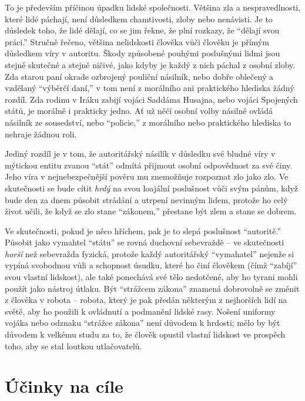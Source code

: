 \documentclass{book}
\begin{document}
To je především příčinou úpadku lidské společnosti. Většina zla a nespravedlnosti, které lidé páchají, není důsledkem chamtivosti, zloby nebo nenávisti. Je to důsledek toho, že lidé dělají, co se jim řekne, že plní rozkazy, že \enquote{dělají svou práci.} Stručně řečeno, většina nelidskosti člověka vůči člověku je přímým důsledkem víry v autoritu. Škody způsobené pouhými poslušnými lidmi jsou stejně skutečné a stejně ničivé, jako kdyby je každý z nich páchal z osobní zloby. Zda starou paní okrade ozbrojený pouliční násilník, nebo dobře oblečený a vzdělaný \enquote{výběrčí daní,} v tom není z morálního ani praktického hlediska žádný rozdíl. Zda rodinu v Iráku zabijí vojáci Saddáma Husajna, nebo vojáci Spojených států, je morálně i prakticky jedno. Ať už něčí osobní volby násilně ovládá násilník ze sousedství, nebo \enquote{policie,} z morálního nebo praktického hlediska to nehraje žádnou roli.

Jediný rozdíl je v tom, že autoritářský násilík v důsledku své bludné víry v mýtickou entitu zvanou \enquote{stát} odmítá přijmout osobní odpovědnost za své činy. Jeho víra v nejnebezpečnější pověru mu znemožňuje rozpoznat zlo jako zlo. Ve skutečnosti se bude cítit \emph{hrdý} na svou loajální poslušnost vůči svým pánům, když bude den za dnem působit strádání a utrpení nevinným lidem, protože ho celý život učili, že když se zlo stane \enquote{zákonem,} přestane být zlem a stane se dobrem.

Ve skutečnosti, pokud je něco hříchem, pak je to slepá poslušnost \enquote{autoritě.} Působit jako vymahtel \enquote{státu} se rovná duchovní sebevraždě -- ve skutečnosti \emph{horší} než sebevražda fyzická, protože každý autoritářský \enquote{vymahatel} nejenže si vypíná svobodnou vůli a schopnost úsudku, které ho činí člověkem (čímž \enquote{zabíjí} svou vlastní lidskost), ale také ponechává své tělo nedotčené, aby ho tyrani mohli použít jako nástroj útlaku. Být \enquote{strážcem zákona} znamená dobrovolně se změnit z člověka v robota -- robota, který je pak předán některým z nejhorších lidí na světě, aby ho použili k ovládnutí a podmanění lidské rasy. Nošení uniformy vojáka nebo odznaku \enquote{strážce zákona} není důvodem k hrdosti; mělo by být důvodem k velkému studu za to, že člověk opustil vlastní lidskost ve prospěch toho, aby se stal loutkou utlačovatelů.

\chapter{Účinky na cíle}
\end{document}
